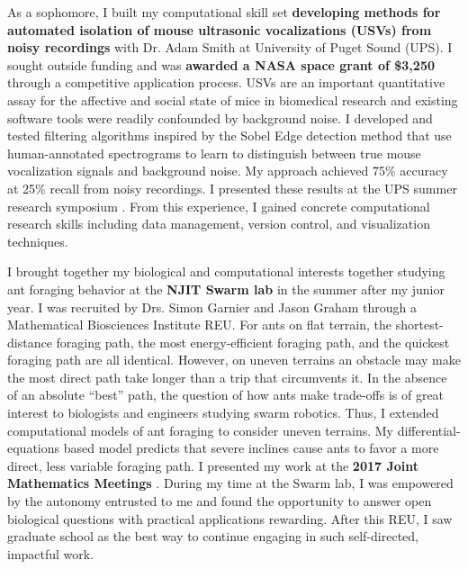 As a sophomore, I built my computational skill set \textbf{developing methods for automated isolation of mouse
ultrasonic vocalizations (USVs) from noisy recordings} with Dr. Adam Smith at University of Puget Sound (UPS).
I sought outside funding and was \textbf{awarded a NASA space grant of \$3,250} through a competitive application process.
USVs are an important quantitative assay for the affective and social state of mice in biomedical research and existing software tools were readily confounded by background noise.
I developed and tested filtering algorithms inspired by the Sobel Edge detection method that use human-annotated spectrograms to learn to distinguish between true mouse vocalization signals and background noise.
My approach achieved 75\% accuracy at 25\% recall from noisy recordings.
I presented these results at the UPS summer research symposium \cite{smith}.
From this experience, I gained concrete computational research skills including data management, version control, and visualization techniques.

I brought together my biological and computational interests together studying ant foraging behavior at the \textbf{NJIT Swarm lab} in the summer after my junior year.
I was recruited by Drs. Simon Garnier and Jason Graham through a Mathematical Biosciences Institute REU.
For ants on flat terrain, the shortest-distance foraging path, the most energy-efficient foraging path, and the quickest foraging path are all identical.
However, on uneven terrains an obstacle may make the most direct path take longer than a trip that circumvents it.
In the absence of an absolute ``best'' path, the question of how ants make trade-offs is of great interest to biologists and engineers studying swarm robotics.
Thus, I extended computational models of ant foraging to consider uneven terrains.
My differential-equations based model predicts that severe inclines cause ants to favor a more direct, less variable foraging path.
I presented my work at the \textbf{2017 Joint Mathematics Meetings} \cite{jmm}.
During my time at the Swarm lab, I was empowered by the autonomy entrusted to me and found the opportunity to answer open biological questions with practical applications rewarding.
After this REU, I saw graduate school as the best way to continue engaging in such self-directed, impactful work.


